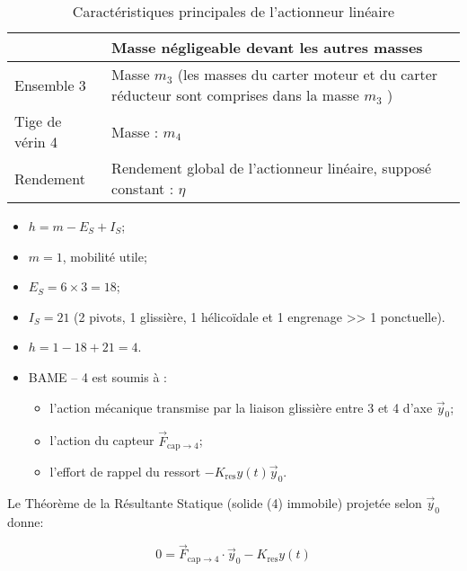 \begin{table}[!h]
\begin{center}
\begin{tabular}{lp{8cm}}
 & Masse négligeable devant les autres masses \\
\hline
Ensemble 3 & Masse $m_{3}$ (les masses du carter moteur et du carter réducteur sont comprises dans la masse $m_{3}$ ) \\
\hline
Tige de vérin 4 & Masse : $m_{4}$ \\
\hline
Rendement & Rendement global de l'actionneur linéaire, supposé constant : $\eta$ \\
\hline
\end{tabular}
\caption{\label{ccs_mp_2023_tab_03} Caractéristiques principales de l'actionneur linéaire}
\end{center}
\end{table}
\fi


\ifprof
\begin{corrige}
\begin{itemize}
\item $h = m-E_S+I_S$;
\item $m=1$, mobilité utile;
\item $E_S = 6\times 3 = 18$;
\item $I_S = 21$ (2 pivots, 1 glissière, 1 hélicoïdale et 1 engrenage >> 1 ponctuelle).
\item $ h = 1-18+21 = 4$.
\end{itemize}

\end{corrige}
\else
\fi


\ifprof
\begin{corrige}
\begin{itemize}
On isole le solide 4.
\item BAME -- 4 est soumis à :
\begin{itemize}
\item l'action mécanique transmise par la liaison glissière entre 3 et 4 d'axe $\overrightarrow{y}_0$;
\item l'action du capteur $\overrightarrow{F}_{\text{cap} \to 4}$;
\item l'effort de rappel du ressort $-K_{\text{res}} y(t) \overrightarrow{y}_0$.
\end{itemize}
\end{itemize}

Le Théorème de la Résultante Statique (solide (4) immobile) projetée selon $\overrightarrow{y}_0$ donne:

$$ \boxed{0 = \overrightarrow{F}_{\text{cap} \to 4} \cdot \overrightarrow{y}_0 - K_{\text{res}} y(t)} $$

\end{corrige}
\else
\fi

